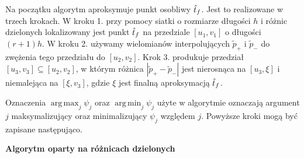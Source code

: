\documentclass[oik, pdftex, robocza, man]{mgrwms}
\DeclareMathOperator*{\argmax}{arg\,max}
\DeclareMathOperator*{\argmin}{arg\,min}
\begin{document}
    Na początku algorytm aproksymuje punkt osobliwy $\hat{t}_f$. Jest to realizowane w trzech krokach. W kroku 1. przy pomocy siatki o rozmiarze długości $h$ i różnic dzielonych lokalizowany jest punkt $\hat{t}_f$ na przedziale $[u_1, v_1]$ o długości $(r + 1)h$. W kroku 2. używamy wielomianów interpolujących $\tilde{p}_+$ i $\tilde{p}_-$ do zwężenia tego przedziału do $[u_2, v_2]$. Krok 3. produkuje przedział $[u_3, v_3] \subseteq [u_2, v_2]$, w którym różnica $|\tilde{p}_{+} - \tilde{p}_{-}|$ jest nierosnąca na $[u_3, \xi]$ i niemalejąca na $[\xi, v_3]$, gdzie $\xi$ jest finalną aproksymacją $\hat{t}_f$.

    Oznaczenia $\argmax_{j} \psi_{j}$ oraz $\argmin_{j} \psi_{j}$ użyte w algorytmie oznaczają argument $j$ maksymalizujący oraz minimalizujący $\psi_{j}$ względem $j$.
    Powyższe kroki mogą być zapisane następująco. \vspace{10pt}

    \newpage
    \textbf{Algorytm oparty na różnicach dzielonych}
\end{document}
